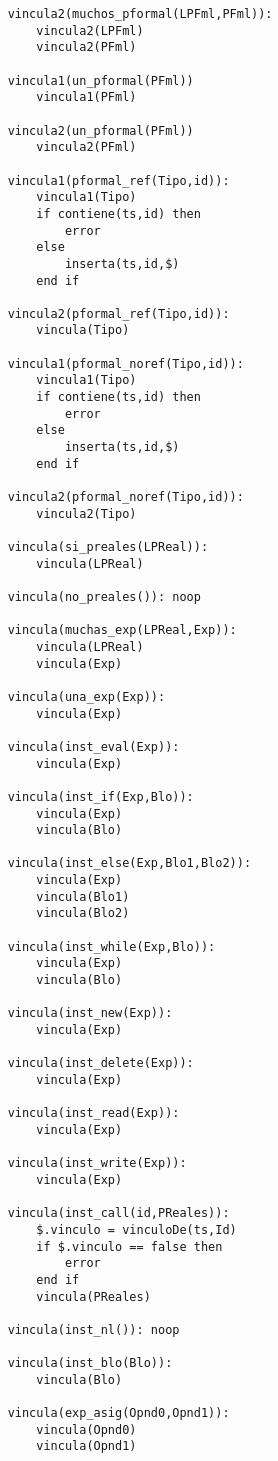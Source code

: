 \begin{lstlisting}
    vincula2(muchos_pformal(LPFml,PFml)):
        vincula2(LPFml)
        vincula2(PFml)

    vincula1(un_pformal(PFml))
        vincula1(PFml)

    vincula2(un_pformal(PFml))
        vincula2(PFml)

    vincula1(pformal_ref(Tipo,id)):
        vincula1(Tipo)
        if contiene(ts,id) then
            error
        else
            inserta(ts,id,$)
        end if

    vincula2(pformal_ref(Tipo,id)):
        vincula(Tipo)

    vincula1(pformal_noref(Tipo,id)):
        vincula1(Tipo)
        if contiene(ts,id) then
            error
        else
            inserta(ts,id,$)
        end if

    vincula2(pformal_noref(Tipo,id)):
        vincula2(Tipo)

    vincula(si_preales(LPReal)):
        vincula(LPReal)

    vincula(no_preales()): noop

    vincula(muchas_exp(LPReal,Exp)):
        vincula(LPReal)
        vincula(Exp)

    vincula(una_exp(Exp)):
        vincula(Exp)

    vincula(inst_eval(Exp)):
        vincula(Exp)

    vincula(inst_if(Exp,Blo)):
        vincula(Exp)
        vincula(Blo)

    vincula(inst_else(Exp,Blo1,Blo2)):
        vincula(Exp)
        vincula(Blo1)
        vincula(Blo2)

    vincula(inst_while(Exp,Blo)):
        vincula(Exp)
        vincula(Blo)

    vincula(inst_new(Exp)):
        vincula(Exp)

    vincula(inst_delete(Exp)):
        vincula(Exp)

    vincula(inst_read(Exp)):
        vincula(Exp)

    vincula(inst_write(Exp)):
        vincula(Exp)

    vincula(inst_call(id,PReales)):
        $.vinculo = vinculoDe(ts,Id)
        if $.vinculo == false then
            error
        end if
        vincula(PReales)

    vincula(inst_nl()): noop

    vincula(inst_blo(Blo)):
        vincula(Blo)

    vincula(exp_asig(Opnd0,Opnd1)):
        vincula(Opnd0)
        vincula(Opnd1)


\end{lstlisting}
